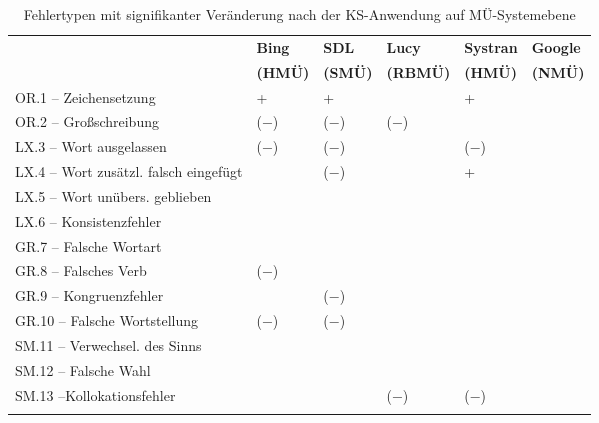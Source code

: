 \begin{table}
\begin{tabularx}{\textwidth}{Xlllll}
\lsptoprule
& \textbf{Bing} &	\textbf{SDL} 	& \textbf{Lucy} &	\textbf{Systran} &	\textbf{Google} \\
& \textbf{(HMÜ)} &	\textbf{(SMÜ)}	&  \textbf{(RBMÜ)}& \textbf{(HMÜ)}&	\textbf{(NMÜ)}\\
\midrule
OR.1 – Zeichensetzung &	+&	+	& &	+ &\\
\tablevspace
OR.2 – Großschreibung &	($-$)&	($-$)&	($-$)& &\\
\tablevspace
LX.3 – Wort ausgelassen	& ($-$)	& ($-$)	& &	($-$)&\\
\tablevspace
LX.4 – Wort zusätzl. falsch eingefügt	& &	($-$)	& &	+	&\\
\tablevspace
LX.5 – Wort unübers. geblieben& & & & & \\
\tablevspace
LX.6 – Konsistenzfehler& & & & &\\
\tablevspace
GR.7 – Falsche Wortart	& & & & & \\
\tablevspace
GR.8 – Falsches Verb &	($-$)	& & & &\\
\tablevspace
GR.9 – Kongruenzfehler	& &	($-$)	& & &\\
\tablevspace
GR.10 – Falsche Wortstellung &	($-$) &	($-$)	& & &\\
\tablevspace
SM.11 – Verwechsel. des Sinns	& & & & &\\
\tablevspace
SM.12 – Falsche Wahl	& & & & &\\
\tablevspace
SM.13 –Kollokationsfehler	& &	&	($-$)&	($-$) &\\
\lspbottomrule
\end{tabularx}
\caption{\label{tab:06:104}Fehlertypen mit signifikanter Veränderung nach der KS-Anwendung auf MÜ-Systemebene}
\end{table}

